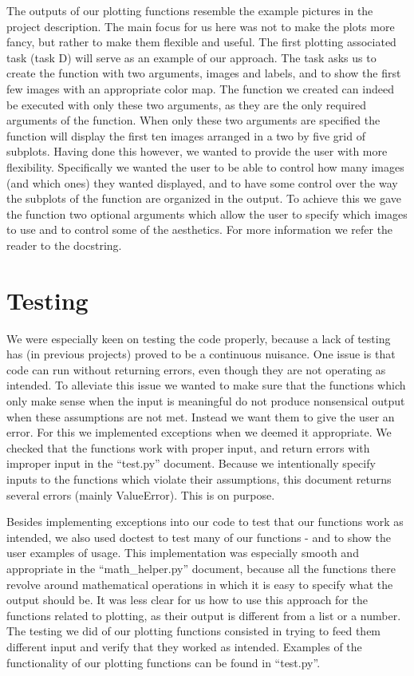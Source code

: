 \documentclass[letterpaper, 12 pt, conference]{ieeeconf}
\begin{document}
The outputs of our plotting functions resemble the example pictures in the project description. The main focus for us here was not to make the plots more fancy, but rather to make them flexible and useful. The first plotting associated task (task D) will serve as an example of our approach. The task asks us to create the function with two arguments, images and labels, and to show the first few images with an appropriate color map. The function we created can indeed be executed with only these two arguments, as they are the only required arguments of the function. When only these two arguments are specified the function will display the first ten images arranged in a two by five grid of subplots. Having done this however, we wanted to provide the user with more flexibility. Specifically we wanted the user to be able to control how many images (and which ones) they wanted displayed, and to have some control over the way the subplots of the function are organized in the output. To achieve this we gave the function two optional arguments which allow the user to specify which images to use and to control some of the aesthetics. For more information we refer the reader to the docstring. 

\section{Testing}

We were especially keen on testing the code properly, because a lack of testing has (in previous projects) proved to be a continuous nuisance. One issue is that code can run without returning errors, even though they are not operating as intended. To alleviate this issue we wanted to make sure that the functions which only make sense when the input is meaningful do not produce nonsensical output when these assumptions are not met. Instead we want them to give the user an error. For this we implemented exceptions when we deemed it appropriate. We checked that the functions work with proper input, and return errors with improper input in the “test.py” document. Because we intentionally specify inputs to the functions which violate their assumptions, this document returns several errors (mainly ValueError). This is on purpose. 

Besides implementing exceptions into our code to test that our functions work as intended, we also used doctest to test many of our functions - and to show the user examples of usage. This implementation was especially smooth and appropriate in the “math\_helper.py” document, because all the functions there revolve around mathematical operations in which it is easy to specify what the output should be. It was less clear for us how to use this approach for the functions related to plotting, as their output is different from a list or a number. The testing we did of our plotting functions consisted in trying to feed them different input and verify that they worked as intended. Examples of the functionality of our plotting functions can be found in “test.py”. 
\end{document}
